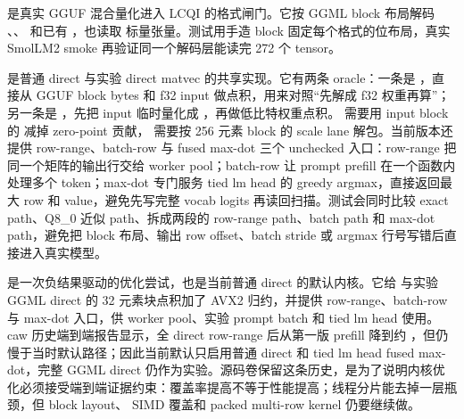 

 是真实 GGUF 混合量化进入 LCQI 的格式闸门。它按 GGML block 布局解码 、、 和已有 ，也读取  标量张量。测试用手造 block 固定每个格式的位布局，真实 SmolLM2 smoke 再验证同一个解码层能读完 272 个 tensor。



 是普通  direct 与实验  direct matvec 的共享实现。它有两条 oracle：一条是 ，直接从 GGUF block bytes 和 f32 input 做点积，用来对照“先解成 f32 权重再算”；另一条是 ，先把 input 临时量化成 ，再做低比特权重点积。 需要用 input block 的  减掉 zero-point 贡献， 需要按 256 元素 block 的 scale lane 解包。当前版本还提供 row-range、batch-row 与 fused max-dot 三个 unchecked 入口：row-range 把同一个矩阵的输出行交给 worker pool；batch-row 让 prompt prefill 在一个函数内处理多个 token；max-dot 专门服务 tied lm head 的 greedy argmax，直接返回最大 row 和 value，避免先写完整 vocab logits 再读回扫描。测试会同时比较 exact path、Q8\_0 近似 path、拆成两段的 row-range path、batch path 和 max-dot path，避免把 block 布局、输出 row offset、batch stride 或 argmax 行号写错后直接进入真实模型。



 是一次负结果驱动的优化尝试，也是当前普通  direct 的默认内核。它给  与实验 GGML direct 的 32 元素块点积加了 AVX2  归约，并提供 row-range、batch-row 与 max-dot 入口，供 worker pool、实验 prompt batch 和 tied lm head 使用。caw 历史端到端报告显示，全  direct row-range 后从第一版  prefill 降到约 ，但仍慢于当时默认路径；因此当前默认只启用普通  direct 和 tied lm head fused max-dot，完整 GGML direct 仍作为实验。源码卷保留这条历史，是为了说明内核优化必须接受端到端证据约束：覆盖率提高不等于性能提高；线程分片能去掉一层瓶颈，但 block layout、 SIMD 覆盖和 packed multi-row kernel 仍要继续做。


